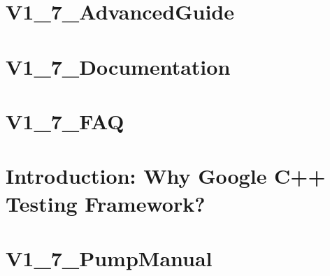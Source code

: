 \documentclass[twoside]{book}
\newcommand{\+}{\discretionary{\mbox{\scriptsize$\hookleftarrow$}}{}{}}
\begin{document}
\chapter{V1\+\_\+7\+\_\+\+Advanced\+Guide}
\label{md__home_bhargavi_Documents_SDR_Copy_Exam_808X_vendor_googletest_googletest_docs_V1_7_AdvancedGuide}
\hypertarget{md__home_bhargavi_Documents_SDR_Copy_Exam_808X_vendor_googletest_googletest_docs_V1_7_AdvancedGuide}{}

\chapter{V1\+\_\+7\+\_\+\+Documentation}
\label{md__home_bhargavi_Documents_SDR_Copy_Exam_808X_vendor_googletest_googletest_docs_V1_7_Documentation}
\hypertarget{md__home_bhargavi_Documents_SDR_Copy_Exam_808X_vendor_googletest_googletest_docs_V1_7_Documentation}{}

\chapter{V1\+\_\+7\+\_\+\+F\+AQ}
\label{md__home_bhargavi_Documents_SDR_Copy_Exam_808X_vendor_googletest_googletest_docs_V1_7_FAQ}
\hypertarget{md__home_bhargavi_Documents_SDR_Copy_Exam_808X_vendor_googletest_googletest_docs_V1_7_FAQ}{}

\chapter{Introduction\+: Why Google C++ Testing Framework?}
\label{md__home_bhargavi_Documents_SDR_Copy_Exam_808X_vendor_googletest_googletest_docs_V1_7_Primer}
\hypertarget{md__home_bhargavi_Documents_SDR_Copy_Exam_808X_vendor_googletest_googletest_docs_V1_7_Primer}{}

\chapter{V1\+\_\+7\+\_\+\+Pump\+Manual}
\label{md__home_bhargavi_Documents_SDR_Copy_Exam_808X_vendor_googletest_googletest_docs_V1_7_PumpManual}
\hypertarget{md__home_bhargavi_Documents_SDR_Copy_Exam_808X_vendor_googletest_googletest_docs_V1_7_PumpManual}{}

\end{document}
